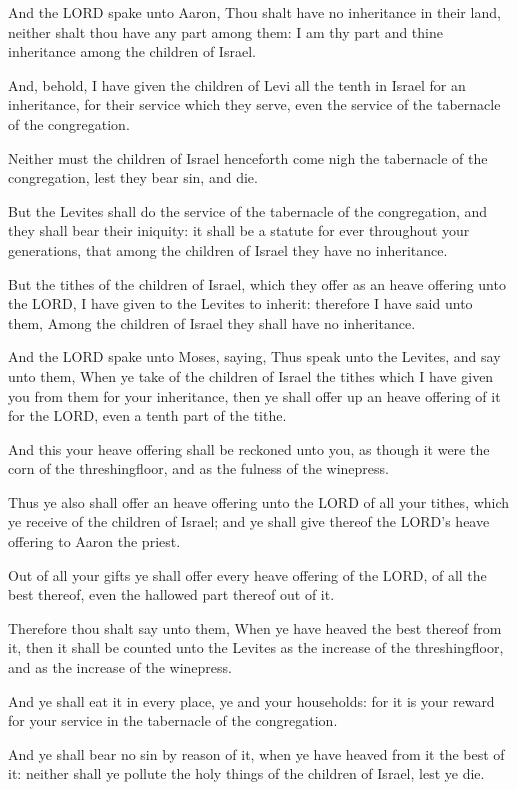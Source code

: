\verse And the LORD spake unto Aaron, Thou shalt have no inheritance in
their land, neither shalt thou have any part among them: I am thy part
and thine inheritance among the children of Israel.

\verse And, behold, I have given the children of Levi all the tenth in
Israel for an inheritance, for their service which they serve, even
the service of the tabernacle of the congregation.

\verse Neither must the children of Israel henceforth come nigh the
tabernacle of the congregation, lest they bear sin, and die.

\verse But the Levites shall do the service of the tabernacle of the
congregation, and they shall bear their iniquity: it shall be a
statute for ever throughout your generations, that among the children
of Israel they have no inheritance.

\verse But the tithes of the children of Israel, which they offer as an
heave offering unto the LORD, I have given to the Levites to inherit:
therefore I have said unto them, Among the children of Israel they
shall have no inheritance.

\verse And the LORD spake unto Moses, saying, \verse Thus speak unto the
Levites, and say unto them, When ye take of the children of Israel the
tithes which I have given you from them for your inheritance, then ye
shall offer up an heave offering of it for the LORD, even a tenth part
of the tithe.

\verse And this your heave offering shall be reckoned unto you, as
though it were the corn of the threshingfloor, and as the fulness of
the winepress.

\verse Thus ye also shall offer an heave offering unto the LORD of all
your tithes, which ye receive of the children of Israel; and ye shall
give thereof the LORD's heave offering to Aaron the priest.

\verse Out of all your gifts ye shall offer every heave offering of the
LORD, of all the best thereof, even the hallowed part thereof out of
it.

\verse Therefore thou shalt say unto them, When ye have heaved the best
thereof from it, then it shall be counted unto the Levites as the
increase of the threshingfloor, and as the increase of the winepress.

\verse And ye shall eat it in every place, ye and your households: for
it is your reward for your service in the tabernacle of the
congregation.

\verse And ye shall bear no sin by reason of it, when ye have heaved
from it the best of it: neither shall ye pollute the holy things of
the children of Israel, lest ye die.


